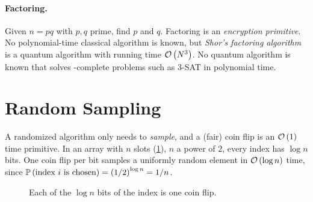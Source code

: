 \paragraph{Factoring.} Given $n = pq$ with $p, q$ prime, find $p$ and $q$. Factoring is an
\emph{encryption primitive}. No polynomial-time classical algorithm is known, but \emph{Shor's
factoring algorithm} is a quantum algorithm with running time $\mathcal{O}\left(N^3\right)$. No quantum algorithm is
known that solves \nptime-complete problems such as 3-SAT in polynomial time.

\section{Random Sampling}

A randomized algorithm only needs to \emph{sample}, and a (fair) coin flip is an $\mathcal{O}\left(1\right)$ time
primitive. In an array with $n$ slots (\cref{fig:coinflips-0825}), $n$ a power of $2$, every index
has $\log n$ bits. One coin flip per bit samples a uniformly random element in $\mathcal{O}\left(\log n\right)$ time,
since $\prob{\text{index $i$ is chosen}} = \left(\sfrac{1}{2}\right)^{\log n} = \sfrac{1}{n}$.

\begin{figure}[ht]
    \centering
    \caption{Each of the $\log n$ bits of the index is one coin flip.}
    \label{fig:coinflips-0825}
\end{figure}

